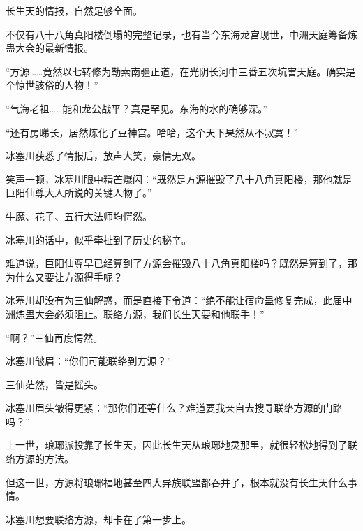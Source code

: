 \begin{this_body}
长生天的情报，自然足够全面。

不仅有八十八角真阳楼倒塌的完整记录，也有当今东海龙宫现世，中洲天庭筹备炼蛊大会的最新情报。

“方源……竟然以七转修为勒索南疆正道，在光阴长河中三番五次坑害天庭。确实是个惊世骇俗的人物！”

“气海老祖……能和龙公战平？真是罕见。东海的水的确够深。”

“还有房睇长，居然炼化了豆神宫。哈哈，这个天下果然从不寂寞！”

冰塞川获悉了情报后，放声大笑，豪情无双。

笑声一顿，冰塞川眼中精芒爆闪：“既然是方源摧毁了八十八角真阳楼，那他就是巨阳仙尊大人所说的关键人物了。”

牛魔、花子、五行大法师均愕然。

冰塞川的话中，似乎牵扯到了历史的秘辛。

难道说，巨阳仙尊早已经算到了方源会摧毁八十八角真阳楼吗？既然是算到了，那为什么又要让方源得手呢？

冰塞川却没有为三仙解惑，而是直接下令道：“绝不能让宿命蛊修复完成，此届中洲炼蛊大会必须阻止。联络方源，我们长生天要和他联手！”

“啊？”三仙再度愕然。

冰塞川皱眉：“你们可能联络到方源？”

三仙茫然，皆是摇头。

冰塞川眉头皱得更紧：“那你们还等什么？难道要我亲自去搜寻联络方源的门路吗？”

上一世，琅琊派投靠了长生天，因此长生天从琅琊地灵那里，就很轻松地得到了联络方源的方法。

但这一世，方源将琅琊福地甚至四大异族联盟都吞并了，根本就没有长生天什么事情。

冰塞川想要联络方源，却卡在了第一步上。

\end{this_body}

